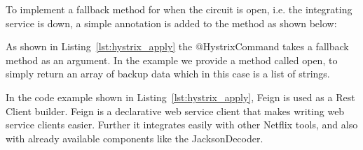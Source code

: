 

\noindent To implement a fallback method for when the circuit is open, i.e. the integrating service is down, a simple annotation is added to the method as shown below:



\noindent As shown in Listing~\ref{lst:hystrix_apply} the @HystrixCommand takes a fallback method as an argument. In the example we provide a method called open, to simply return an array of backup data which in this case is a list of strings.

\noindent In the code example shown in Listing~\ref{lst:hystrix_apply}, Feign is used as a Rest Client builder. Feign is a declarative web service client that makes writing web service clients easier. Further it integrates easily with other Netflix tools, and also with already available components like the JacksonDecoder. 